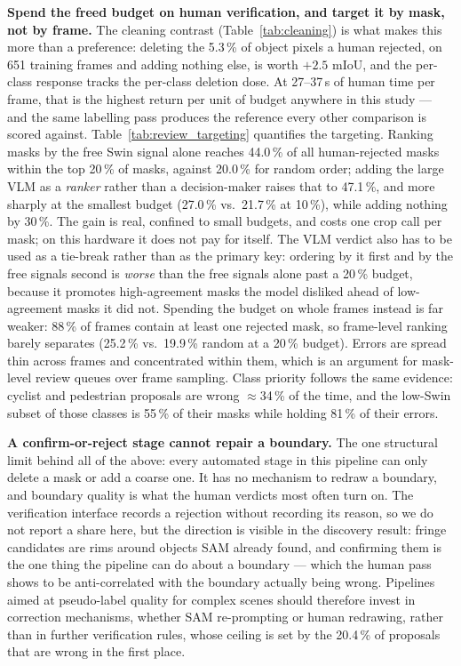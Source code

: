 \documentclass[conference]{IEEEtran}
\begin{document}
\textbf{Spend the freed budget on human verification, and target it by mask, not by frame.}
The cleaning contrast (Table~\ref{tab:cleaning}) is what makes this more than a preference: deleting
the 5.3\,\% of object pixels a human rejected, on 651 training frames and adding nothing else, is
worth $+2.5$ mIoU, and the per-class response tracks the per-class deletion dose. At 27--37\,s of human
time per frame, that is the highest return per unit of budget anywhere in this study --- and the same
labelling pass produces the reference every other comparison is scored against.
Table~\ref{tab:review_targeting} quantifies the targeting. Ranking masks by the free Swin signal alone
reaches 44.0\,\% of all human-rejected masks within the top 20\,\% of masks, against
20.0\,\% for random order; adding the large VLM as a \emph{ranker} rather than a decision-maker
raises that to 47.1\,\%, and more sharply at the smallest budget (27.0\,\% vs.\ 21.7\,\%
at 10\,\%), while adding nothing by 30\,\%. The gain is real, confined to small budgets, and costs one
crop call per mask; on this hardware it does not pay for itself.
The VLM verdict also has to be used as a tie-break rather than as the primary key: ordering by it first
and by the free signals second is \emph{worse} than the free signals alone past a 20\,\% budget,
because it promotes high-agreement masks the model disliked ahead of low-agreement masks it did not.
Spending the budget on whole frames instead is far weaker: 88\,\% of
frames contain at least one rejected mask, so frame-level ranking barely separates
(25.2\,\% vs.\ 19.9\,\% random at a 20\,\% budget). Errors are spread thin across frames
and concentrated within them, which is an argument for mask-level review queues over frame sampling.
Class priority follows the same evidence: cyclist and pedestrian proposals are wrong
$\approx$34\,\% of the time, and the low-Swin subset of those classes is
55\,\% of their masks while holding 81\,\% of their errors.



\textbf{A confirm-or-reject stage cannot repair a boundary.}
The one structural limit behind all of the above: every automated stage in this pipeline can only
delete a mask or add a coarse one. It has no mechanism to redraw a boundary, and boundary quality is
what the human verdicts most often turn on. The verification interface records a rejection without
recording its reason, so we do not report a share here, but the direction is visible in the
discovery result: fringe candidates are rims around objects SAM already found, and confirming them is
the one thing the pipeline can do about a boundary --- which the human pass shows to be
anti-correlated with the boundary actually being wrong.
Pipelines aimed at pseudo-label quality for complex scenes should therefore invest in correction
mechanisms, whether SAM re-prompting or human redrawing, rather than in further verification rules,
whose ceiling is set by the 20.4\,\% of proposals that are wrong in the first place.
\end{document}
